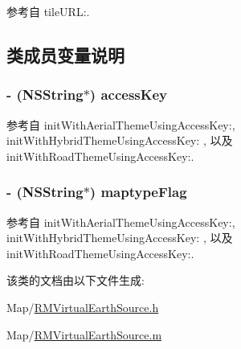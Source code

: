 参考自 tile\-U\-R\-L\-:.



\subsection{类成员变量说明}
\hypertarget{interface_r_m_virtual_earth_source_a1cb125def16c266a7fa0b36e6e676df1}{
\subsubsection[{access\-Key}]{\setlength{\rightskip}{0pt plus 5cm}-\/ (N\-S\-String$\ast$) access\-Key\hspace{0.3cm}{\ttfamily [protected]}}}\label{interface_r_m_virtual_earth_source_a1cb125def16c266a7fa0b36e6e676df1}


参考自 init\-With\-Aerial\-Theme\-Using\-Access\-Key\-:, init\-With\-Hybrid\-Theme\-Using\-Access\-Key\-: , 以及 init\-With\-Road\-Theme\-Using\-Access\-Key\-:.

\hypertarget{interface_r_m_virtual_earth_source_a77400af8873105e2d8f28ac76f26cf40}{
\subsubsection[{maptype\-Flag}]{\setlength{\rightskip}{0pt plus 5cm}-\/ (N\-S\-String$\ast$) maptype\-Flag\hspace{0.3cm}{\ttfamily [protected]}}}\label{interface_r_m_virtual_earth_source_a77400af8873105e2d8f28ac76f26cf40}


参考自 init\-With\-Aerial\-Theme\-Using\-Access\-Key\-:, init\-With\-Hybrid\-Theme\-Using\-Access\-Key\-: , 以及 init\-With\-Road\-Theme\-Using\-Access\-Key\-:.



该类的文档由以下文件生成\-:\begin{DoxyCompactItemize}
\item 
Map/\hyperlink{_r_m_virtual_earth_source_8h}{R\-M\-Virtual\-Earth\-Source.\-h}\item 
Map/\hyperlink{_r_m_virtual_earth_source_8m}{R\-M\-Virtual\-Earth\-Source.\-m}\end{DoxyCompactItemize}
